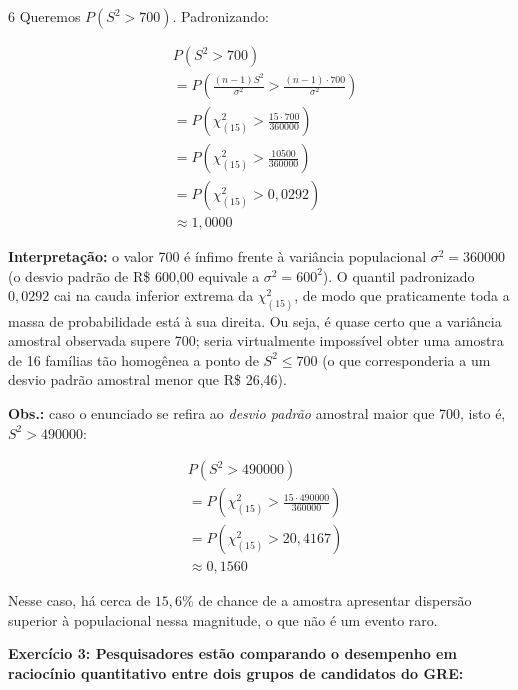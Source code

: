 \documentclass[8pt, a4paper, landscape]{extarticle}
\begin{document}
\begin{multicols}{6}
Queremos $P(S^2 > 700)$. Padronizando:

\begin{equation*}
\begin{split}
&P\left(S^2 > 700\right) \\
&= P\left(\frac{(n-1)S^2}{\sigma^2} > \frac{(n-1)\cdot 700}{\sigma^2}\right) \\
&= P\left(\chi^2_{(15)} > \frac{15 \cdot 700}{360000}\right) \\
&= P\left(\chi^2_{(15)} > \frac{10500}{360000}\right) \\
&= P\left(\chi^2_{(15)} > 0,0292\right) \\
&\approx 1,0000
\end{split}
\end{equation*}

\textbf{Interpretação:} o valor 700 é ínfimo frente à variância populacional $\sigma^2 = 360000$ (o desvio padrão de R\$ 600,00 equivale a $\sigma^2 = 600^2$). O quantil padronizado $0,0292$ cai na cauda inferior extrema da $\chi^2_{(15)}$, de modo que praticamente toda a massa de probabilidade está à sua direita. Ou seja, é quase certo que a variância amostral observada supere 700; seria virtualmente impossível obter uma amostra de 16 famílias tão homogênea a ponto de $S^2 \leq 700$ (o que corresponderia a um desvio padrão amostral menor que R\$ 26,46).

\vspace{0.2cm}

\textbf{Obs.:} caso o enunciado se refira ao \textit{desvio padrão} amostral maior que 700, isto é, $S^2 > 490000$:

\begin{equation*}
\begin{split}
&P\left(S^2 > 490000\right) \\
&= P\left(\chi^2_{(15)} > \frac{15 \cdot 490000}{360000}\right) \\
&= P\left(\chi^2_{(15)} > 20,4167\right) \\
&\approx 0,1560
\end{split}
\end{equation*}

Nesse caso, há cerca de $15,6\%$ de chance de a amostra apresentar dispersão superior à populacional nessa magnitude, o que não é um evento raro.

\textbf{Exercício 3: Pesquisadores estão comparando o desempenho em raciocínio quantitativo entre dois grupos de candidatos do GRE:}


\end{multicols}
\end{document}
